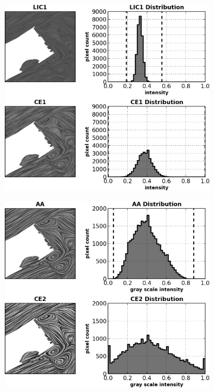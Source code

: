 \documentclass[a4paper,10pt]{article}
\begin{document}
\begin{figure}[ht]
 \centering
\begin{subfigure}{0.48\textwidth}
\includegraphics[width=\textwidth]{./images-data/dia-serial/gray-ce1-curves.png}
\caption{}
\label{fig:gray-ce-curves1}
\end{subfigure}
\hspace{0.15in}
\begin{subfigure}{0.48\textwidth}
\includegraphics[width=\textwidth]{./images-data/dia-serial/gray-ce2-curves.png}
\caption{}
\label{fig:gray-ce-curves2}
\end{subfigure}
\end{figure}
\end{document}
